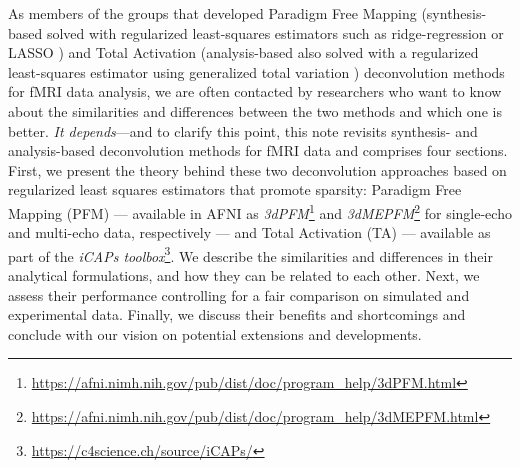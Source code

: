 As members of the groups that developed Paradigm Free Mapping (synthesis-based
solved with regularized least-squares estimators such as
ridge-regression \citealt{Gaudes2010Detectioncharacterizationsingle} or LASSO
\citealt{Gaudes2013Paradigmfreemapping}) and Total Activation (analysis-based
also solved with a regularized least-squares estimator using
generalized total variation
\citealt{Karahanoglu2011SignalProcessingApproach,Karahanoglu2013TotalactivationfMRI}
) deconvolution methods for fMRI data analysis, we are often contacted by
researchers who want to know about the similarities and differences between the
two methods and which one is better. \emph{It depends}---and to clarify this
point, this note revisits synthesis- and analysis-based deconvolution methods
for fMRI data and comprises four sections. First, we present the theory behind
these two deconvolution approaches based on regularized least squares estimators
that promote sparsity: Paradigm Free Mapping (PFM)
\citep{Gaudes2013Paradigmfreemapping} --- available in AFNI as
\textit{3dPFM}\footnote{\url{https://afni.nimh.nih.gov/pub/dist/doc/program_help/3dPFM.html}}
and
\textit{3dMEPFM}\footnote{\url{https://afni.nimh.nih.gov/pub/dist/doc/program_help/3dMEPFM.html}}
for single-echo and multi-echo data, respectively --- and Total Activation (TA)
\citep{Karahanoglu2013TotalactivationfMRI} --- available as part of the
\textit{iCAPs toolbox}\footnote{\url{https://c4science.ch/source/iCAPs/}}. We
describe the similarities and differences in their analytical formulations, and
how they can be related to each other. Next, we assess their performance
controlling for a fair comparison on simulated and experimental data. Finally,
we discuss their benefits and shortcomings and conclude with our vision on
potential extensions and developments.
